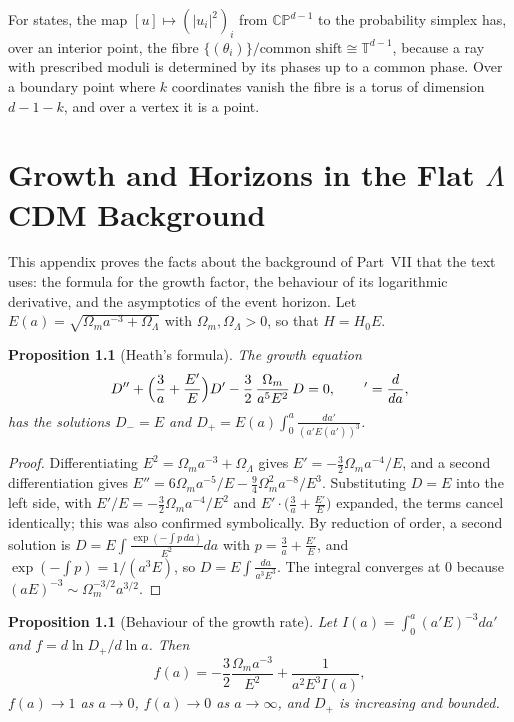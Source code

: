 \documentclass[11pt,oneside]{book}
\newtheorem{proposition}[theorem]{Proposition}
\theoremstyle{definition}
\theoremstyle{remark}
\begin{document}
For states, the map $[u]\mapsto(|u_i|^2)_i$ from $\mathbb{CP}^{d-1}$ to the probability simplex has, over an interior point, the fibre $\{(\theta_i)\}/\text{common shift}\cong\mathbb T^{d-1}$, because a ray with prescribed moduli is determined by its phases up to a common phase. Over a boundary point where $k$ coordinates vanish the fibre is a torus of dimension $d-1-k$, and over a vertex it is a point.

\chapter{Growth and Horizons in the Flat $\Lambda$CDM Background}\label{app:lcdm}

This appendix proves the facts about the background of Part~VII that the text uses: the formula for the growth factor, the behaviour of its logarithmic derivative, and the asymptotics of the event horizon. Let $E(a)=\sqrt{\Omega_ma^{-3}+\Omega_\Lambda}$ with $\Omega_m,\Omega_\Lambda>0$, so that $H=H_0E$.

\begin{proposition}[Heath's formula]\label{prop:app-heath}
The growth equation
\[
D''+\Bigl(\frac3a+\frac{E'}E\Bigr)D'-\frac32\,\frac{\Omega_m}{a^5E^2}\,D=0 ,\qquad{}'=\frac d{da},
\]
has the solutions $D_-=E$ and $D_+=E(a)\int_0^a\frac{da'}{(a'E(a'))^3}$.
\end{proposition}

\begin{proof}
Differentiating $E^2=\Omega_ma^{-3}+\Omega_\Lambda$ gives $E'=-\tfrac32\Omega_ma^{-4}/E$, and a second differentiation gives $E''=6\Omega_ma^{-5}/E-\tfrac94\Omega_m^2a^{-8}/E^3$. Substituting $D=E$ into the left side, with $E'/E=-\tfrac32\Omega_ma^{-4}/E^2$ and $E'\cdot\bigl(\tfrac3a+\tfrac{E'}E\bigr)$ expanded, the terms cancel identically; this was also confirmed symbolically. By reduction of order, a second solution is $D=E\int\frac{\exp(-\int p\,da)}{E^2}da$ with $p=\tfrac3a+\tfrac{E'}E$, and $\exp(-\int p)=1/(a^3E)$, so $D=E\int\frac{da}{a^3E^3}$. The integral converges at $0$ because $(aE)^{-3}\sim\Omega_m^{-3/2}a^{3/2}$.
\end{proof}

\begin{proposition}[Behaviour of the growth rate]\label{prop:app-f}
Let $I(a)=\int_0^a(a'E)^{-3}da'$ and $f=d\ln D_+/d\ln a$. Then
\[
f(a)=-\frac32\frac{\Omega_ma^{-3}}{E^2}+\frac1{a^2E^3I(a)},
\]
$f(a)\to1$ as $a\to0$, $f(a)\to0$ as $a\to\infty$, and $D_+$ is increasing and bounded.
\end{proposition}
\end{document}
